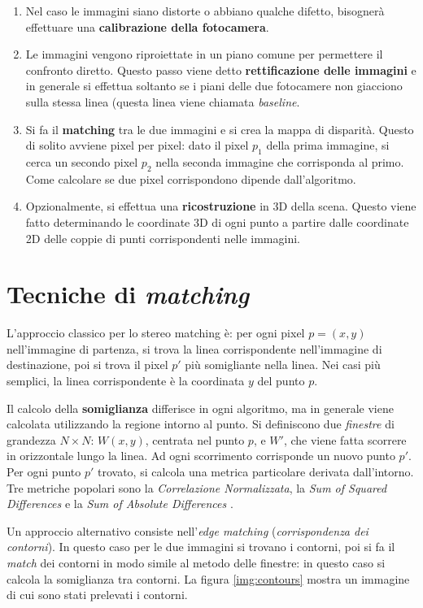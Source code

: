 \documentclass[12pt,a4paper,openright,twoside]{report}
\begin{document}
\begin{enumerate}
    \item Nel caso le immagini siano distorte o abbiano qualche difetto, bisognerà effettuare una \textbf{calibrazione della fotocamera}.
    \item Le immagini vengono riproiettate in un piano comune per permettere il confronto diretto. Questo passo viene detto \textbf{rettificazione delle immagini} e in generale si effettua soltanto se i piani delle due fotocamere non giacciono sulla stessa linea (questa linea viene chiamata \textit{baseline}.
    \item Si fa il \textbf{matching} tra le due immagini e si crea la mappa di disparità. Questo di solito avviene pixel per pixel: dato il pixel $p_{1}$ della prima immagine, si cerca un secondo pixel $p_{2}$ nella seconda immagine che corrisponda al primo. Come calcolare se due pixel corrispondono dipende dall'algoritmo.
    \item Opzionalmente, si effettua una \textbf{ricostruzione} in 3D della scena. Questo viene fatto determinando le coordinate 3D di ogni punto a partire dalle coordinate 2D delle coppie di punti corrispondenti nelle immagini.
\end{enumerate}

\section{Tecniche di \textit{matching}}

L'approccio classico per lo stereo matching è: per ogni pixel $p = (x, y)$ nell'immagine di partenza, si trova la linea corrispondente nell'immagine di destinazione, poi si trova il pixel $p'$ più somigliante nella linea. Nei casi più semplici, la linea corrispondente è la coordinata $y$ del punto $p$.

Il calcolo della \textbf{somiglianza} differisce in ogni algoritmo, ma in generale viene calcolata utilizzando la regione intorno al punto. Si definiscono due \textit{finestre} di grandezza $N \times N$: $W (x, y)$, centrata nel punto $p$, e $W'$, che viene fatta scorrere in orizzontale lungo la linea. Ad ogni scorrimento corrisponde un nuovo punto $p'$. Per ogni punto $p'$ trovato, si calcola una metrica particolare derivata dall'intorno. Tre metriche popolari sono la \textit{Correlazione Normalizzata}, la \textit{Sum of Squared Differences} e la \textit{Sum of Absolute Differences} \cite{stereomatchingalgos}.

Un approccio alternativo consiste nell'\textit{edge matching} (\textit{corrispondenza dei contorni}). In questo caso per le due immagini si trovano i contorni, poi si fa il \textit{match} dei contorni in modo simile al metodo delle finestre: in questo caso si calcola la somiglianza tra contorni. La figura \ref{img:contours} mostra un immagine di cui sono stati prelevati i contorni.
\end{document}
